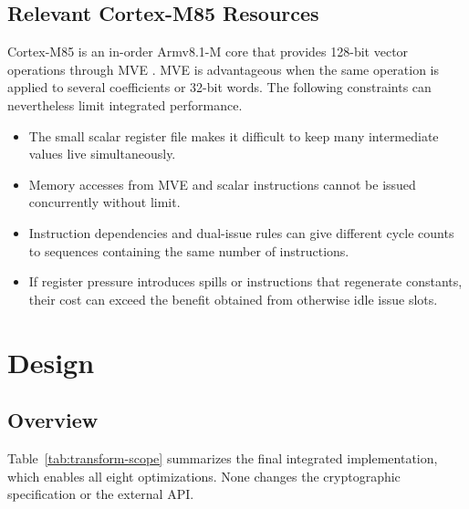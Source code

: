 \documentclass[runningheads,orivec]{llncs}
\begin{document}
\subsection{Relevant Cortex-M85 Resources}

Cortex-M85 is an in-order Armv8.1-M core that provides 128-bit vector operations
through MVE \cite{ArmM85Opt}. MVE is advantageous when the same operation is
applied to several coefficients or 32-bit words. The following constraints can
nevertheless limit integrated performance.
\begin{itemize}[leftmargin=*,itemsep=1pt]
\item The small scalar register file makes it difficult to keep many
      intermediate values live simultaneously.
\item Memory accesses from MVE and scalar instructions cannot be issued
      concurrently without limit.
\item Instruction dependencies and dual-issue rules can give different cycle
      counts to sequences containing the same number of instructions.
\item If register pressure introduces spills or instructions that regenerate
      constants, their cost can exceed the benefit obtained from otherwise idle
      issue slots.
\end{itemize}

\FloatBarrier
\section{Design}\label{sec:design}

\subsection{Overview}

Table~\ref{tab:transform-scope} summarizes the final integrated implementation,
which enables all eight optimizations. None changes the cryptographic
specification or the external API.
\end{document}
